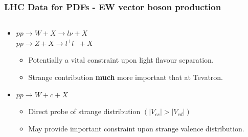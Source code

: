 \documentclass[10pt]{beamer}
\begin{document}
\begin{frame}
\frametitle{ LHC Data for PDFs - EW vector boson production  }


\begin{columns}

	\begin{column}{0.5\textwidth}
	
	\begin{itemize}
\item<1-> $pp \to W+X \to l\nu + X$ \\ $pp\to Z+X \to l^{+}l^{-} + X$
	\begin{itemize}
\item<1-> Potentially a vital constraint upon light flavour separation.
\end{itemize}
	\begin{itemize}
\item<1-> Strange contribution \textbf {much} more important that at Tevatron.
\end{itemize}
\end{itemize}
\vskip15pt

\begin{itemize}
\item<1-> $pp \to W+c+X $
	\begin{itemize}
\item<1-> Direct probe of strange distribution $(|V_{cs}|>|V_{cd}|)$
\end{itemize}
	\begin{itemize}
\item<1-> May provide important constraint upon strange valence distribution.
\end{itemize}
\end{itemize}
	
\end{column}


\end{columns}
\end{frame}
\end{document}
